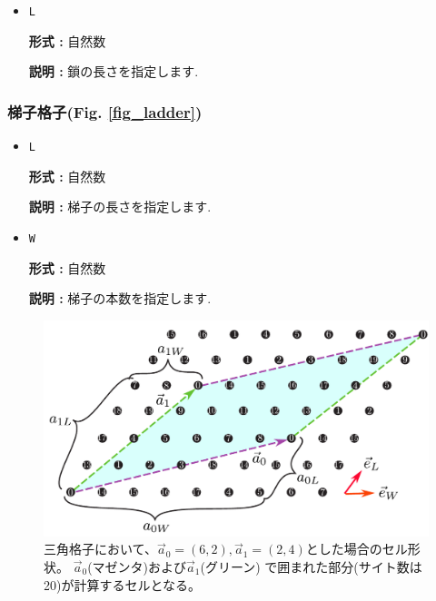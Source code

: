 \begin{itemize}

\item \verb|L|

{\bf 形式 :} 自然数

{\bf 説明 :} 鎖の長さを指定します. 

\end{itemize}

\subsubsection{梯子格子(Fig. \ref{fig_ladder})}

\begin{itemize}

\item \verb|L|

{\bf 形式 :} 自然数

{\bf 説明 :} 梯子の長さを指定します. 

\item \verb|W|

{\bf 形式 :} 自然数

{\bf 説明 :} 梯子の本数を指定します. 

\end{itemize}

\begin{figure}[!htbp]
  \begin{center}
    \includegraphics[width=15cm]{../figs/chap04_1_unitlattice.pdf}
    \caption{三角格子において、${\vec a}_0 = (6, 2), {\vec a}_1 = (2, 4)$とした場合のセル形状。
      ${\vec a}_0$(マゼンタ)および${\vec a}_1$(グリーン)
      で囲まれた部分(サイト数は20)が計算するセルとなる。
    }
    \label{fig_chap04_1_unitlattice}
  \end{center}
\end{figure}

